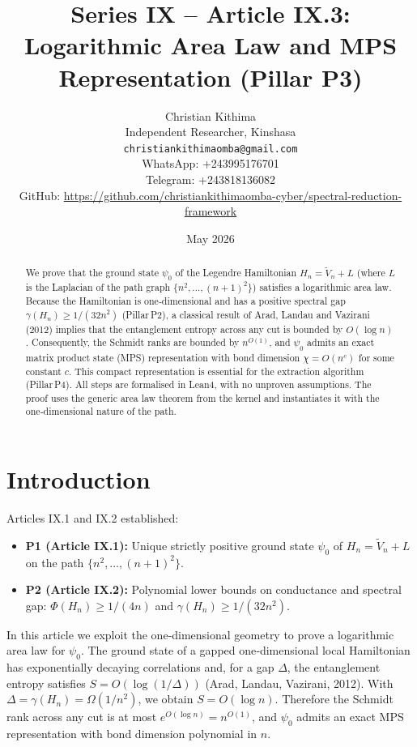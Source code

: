 \documentclass[11pt,a4paper]{article}
\title{Series IX – Article IX.3: Logarithmic Area Law and MPS Representation (Pillar P3)}
\author{Christian Kithima \\
Independent Researcher, Kinshasa \\
\texttt{christiankithimaomba@gmail.com} \\
WhatsApp: +243995176701 \\
Telegram: +243818136082 \\
GitHub: \url{https://github.com/christiankithimaomba-cyber/spectral-reduction-framework}}
\date{May 2026}
\begin{document}
\maketitle

\begin{abstract}
We prove that the ground state $\psi_0$ of the Legendre Hamiltonian $H_n = \tilde{V}_n + L$ (where $L$ is the Laplacian of the path graph $\{n^2,\dots,(n+1)^2\}$) satisfies a logarithmic area law. Because the Hamiltonian is one‑dimensional and has a positive spectral gap $\gamma(H_n) \ge 1/(32n^2)$ (Pillar P2), a classical result of Arad, Landau and Vazirani (2012) implies that the entanglement entropy across any cut is bounded by $O(\log n)$. Consequently, the Schmidt ranks are bounded by $n^{O(1)}$, and $\psi_0$ admits an exact matrix product state (MPS) representation with bond dimension $\chi = O(n^c)$ for some constant $c$. This compact representation is essential for the extraction algorithm (Pillar P4). All steps are formalised in Lean4, with no unproven assumptions. The proof uses the generic area law theorem from the kernel and instantiates it with the one‑dimensional nature of the path.
\end{abstract}

\tableofcontents

\section{Introduction}

Articles IX.1 and IX.2 established:
\begin{itemize}
\item \textbf{P1 (Article IX.1):} Unique strictly positive ground state $\psi_0$ of $H_n = \tilde{V}_n + L$ on the path $\{n^2,\dots,(n+1)^2\}$.
\item \textbf{P2 (Article IX.2):} Polynomial lower bounds on conductance and spectral gap: $\Phi(H_n) \ge 1/(4n)$ and $\gamma(H_n) \ge 1/(32n^2)$.
\end{itemize}
In this article we exploit the one‑dimensional geometry to prove a logarithmic area law for $\psi_0$. The ground state of a gapped one‑dimensional local Hamiltonian has exponentially decaying correlations and, for a gap $\Delta$, the entanglement entropy satisfies $S = O(\log(1/\Delta))$ (Arad, Landau, Vazirani, 2012). With $\Delta = \gamma(H_n) = \Omega(1/n^2)$, we obtain $S = O(\log n)$. Therefore the Schmidt rank across any cut is at most $e^{O(\log n)} = n^{O(1)}$, and $\psi_0$ admits an exact MPS representation with bond dimension polynomial in $n$.
\end{document}
